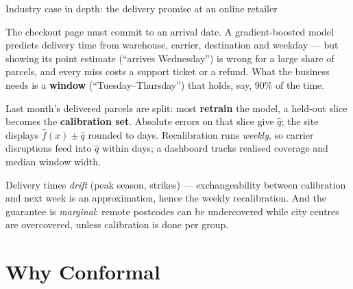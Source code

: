 \documentclass[aspectratio=169,11pt]{beamer}
\begin{document}
\begin{frame}{Industry case in depth: the delivery promise at an online retailer}
  \footnotesize
  \begin{industry}
    The checkout page must commit to an arrival date. A gradient-boosted model predicts
    delivery time from warehouse, carrier, destination and weekday --- but showing its
    point estimate (``arrives Wednesday'') is wrong for a large share of parcels, and
    every miss costs a support ticket or a refund. What the business needs is a
    \textbf{window} (``Tuesday--Thursday'') that holds, say, 90\% of the time.
  \end{industry}
  \begin{readme}
    Last month's delivered parcels are split: most \textbf{retrain} the model, a held-out
    slice becomes the \textbf{calibration set}. Absolute errors on that slice give
    $\hat q$; the site displays $\hat f(x) \pm \hat q$ rounded to days. Recalibration
    runs \emph{weekly}, so carrier disruptions feed into $\hat q$ within days; a
    dashboard tracks realised coverage and median window width.
  \end{readme}
  \begin{takeaway}
    Delivery times \emph{drift} (peak season, strikes) --- exchangeability between
    calibration and next week is an approximation, hence the weekly recalibration.
    And the guarantee is \emph{marginal}: remote postcodes can be undercovered while
    city centres are overcovered, unless calibration is done per group.
  \end{takeaway}
\end{frame}

\section{Why Conformal}
\end{document}
